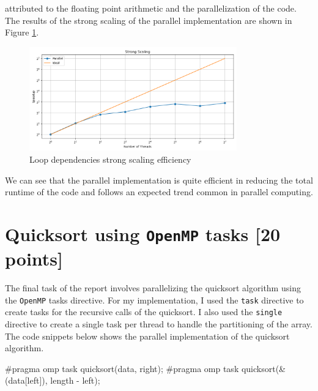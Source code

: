 \documentclass[unicode,11pt,a4paper,oneside,numbers=endperiod,openany]{scrartcl}
\begin{document}
attributed to the floating point arithmetic and the parallelization of the code.
The results of the strong scaling of the parallel implementation are shown in Figure
\ref{fig:loop-dependencies}.
\begin{figure}[h]
  \centering
  \includegraphics[width=0.8\textwidth]{../loop-dependencies/strong_scaling_plot.png}
  \caption{Loop dependencies strong scaling efficiency}
  \label{fig:loop-dependencies}
\end{figure}
We can see that the parallel implementation is quite efficient in reducing the
total runtime of the code and follows an expected trend common in parallel 
computing.
\section{Quicksort using \texttt{OpenMP} tasks [20 points]}
The final task of the report involves parallelizing the quicksort algorithm
using the \texttt{OpenMP} tasks directive. For my implementation, I used the
\texttt{task} directive to create tasks for the recursive calls of the
quicksort. I also used the \texttt{single} directive to create a single task 
per thread to handle the partitioning of the array. The code snippets below
shows the parallel implementation of the quicksort algorithm.
\begin{cppverbatim}
#pragma omp task
  quicksort(data, right);
#pragma omp task
  quicksort(&(data[left]), length - left);
\end{cppverbatim}
\end{document}
